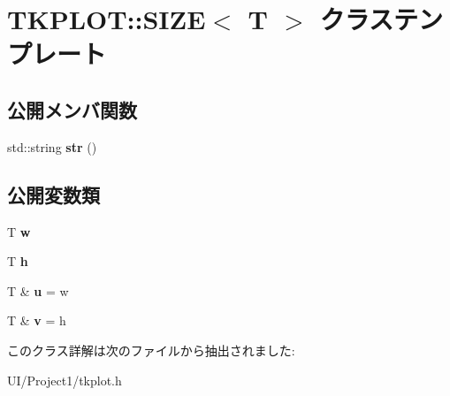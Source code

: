 \hypertarget{class_t_k_p_l_o_t_1_1_s_i_z_e}{}\section{T\+K\+P\+L\+OT\+:\+:S\+I\+ZE$<$ T $>$ クラステンプレート}
\label{class_t_k_p_l_o_t_1_1_s_i_z_e}
\subsection*{公開メンバ関数}
\begin{DoxyCompactItemize}
\item 
\mbox{\label{class_t_k_p_l_o_t_1_1_s_i_z_e_a876e32d89a46cb96f9020c699b43b9ed}} 
std\+::string {\bfseries str} ()
\end{DoxyCompactItemize}
\subsection*{公開変数類}
\begin{DoxyCompactItemize}
\item 
\mbox{\label{class_t_k_p_l_o_t_1_1_s_i_z_e_a11e6a0ae01e934f1f03cd091a778a4f7}} 
T {\bfseries w}
\item 
\mbox{\label{class_t_k_p_l_o_t_1_1_s_i_z_e_af53c6cc5ae8485c0e5842ce59783d39e}} 
T {\bfseries h}
\item 
\mbox{\label{class_t_k_p_l_o_t_1_1_s_i_z_e_ad01852541685a33ee9ac7fb1fbee13bf}} 
T \& {\bfseries u} = w
\item 
\mbox{\label{class_t_k_p_l_o_t_1_1_s_i_z_e_ac1fb3da1cbaf26656371b68b1f2955a3}} 
T \& {\bfseries v} = h
\end{DoxyCompactItemize}


このクラス詳解は次のファイルから抽出されました\+:\begin{DoxyCompactItemize}
\item 
U\+I/\+Project1/tkplot.\+h\end{DoxyCompactItemize}
